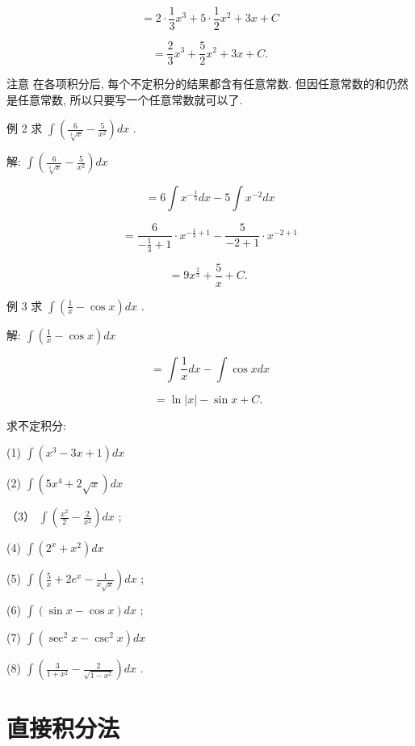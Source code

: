 \documentclass[lang=cn,newtx,12pt,scheme=chinese]{elegantbook}
\begin{document}
\[
= 2 \cdot \frac{1}{3}{x}^{3} + 5 \cdot \frac{1}{2}{x}^{2} + {3x} + C
\]

\[
= \frac{2}{3}{x}^{3} + \frac{5}{2}{x}^{2} + {3x} + C.
\]

注意 在各项积分后, 每个不定积分的结果都含有任意常数. 但因任意常数的和仍然是任意常数, 所以只要写一个任意常数就可以了.

例 2 求 \(\int \left( {\frac{6}{\sqrt[3]{x}} - \frac{5}{{x}^{2}}}\right) {dx}\) .

解: \(\int \left( {\frac{6}{\sqrt[3]{x}} - \frac{5}{{x}^{2}}}\right) {dx}\)

\[
= 6\int {x}^{-\frac{1}{3}}{dx} - 5\int {x}^{-2}{dx}
\]

\[
= \frac{6}{-\frac{1}{3} + 1} \cdot {x}^{-\frac{1}{3} + 1} - \frac{5}{-2 + 1} \cdot {x}^{-2 + 1}
\]

\[
= 9{x}^{\frac{2}{3}} + \frac{5}{x} + C\text{. }
\]

例 3 求 \(\int \left( {\frac{1}{x} - \cos x}\right) {dx}\) .

解: \(\int \left( {\frac{1}{x} - \cos x}\right) {dx}\)

\[
= \int \frac{1}{x}{dx} - \int \cos {xdx}
\]

\[
= \ln \left| x\right| - \sin x + C\text{. }
\]

\begin{problemset}[练习]

\item 求不定积分:

(1) \(\int \left( {{x}^{3} - {3x} + 1}\right) {dx}\)

(2) \(\int \left( {5{x}^{4} + 2\sqrt{x}}\right) {dx}\)

（3） \(\int \left( {\frac{{x}^{2}}{2} - \frac{2}{{x}^{2}}}\right) {dx}\) ;

(4) \(\int \left( {{2}^{x} + {x}^{2}}\right) {dx}\)

(5) \(\int \left( {\frac{5}{x} + 2{e}^{x} - \frac{1}{x\sqrt{x}}}\right) {dx}\) ;

(6) \(\int \left( {\sin x - \cos x}\right) {dx}\) ;

(7) \(\int \left( {{\sec }^{2}x - {\csc }^{2}x}\right) {dx}\)

(8) \(\int \left( {\frac{3}{1 + {x}^{2}} - \frac{2}{\sqrt{1 - {x}^{2}}}}\right) {dx}\) .

\end{problemset}

\section{直接积分法}
\end{document}
